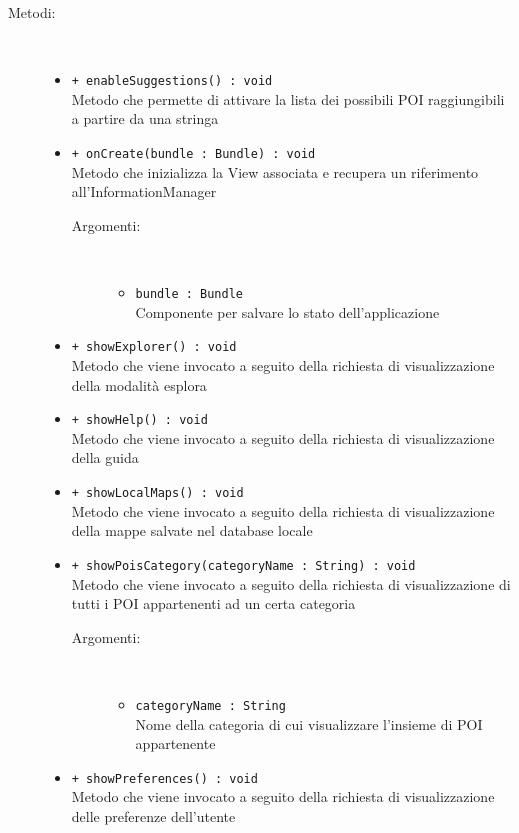 \documentclass[../DefinizioneDiProdotto.tex]{subfiles}
\begin{document}
\begin{description}
\begin{itemize}
\end{itemize}
\item[Metodi:] \
\begin{itemize}
\item \texttt{+ enableSuggestions() : void}\\
Metodo che permette di attivare la lista dei possibili POI raggiungibili a partire da una stringa
 \item \texttt{+ onCreate(bundle : Bundle) : void}\\
Metodo che inizializza la View associata e recupera un riferimento all'InformationManager
 \begin{description}
\item[Argomenti:] \
\begin{itemize}
\item \texttt{bundle : Bundle}\\
Componente per salvare lo stato dell'applicazione\end{itemize}
\end{description}
\item \texttt{+ showExplorer() : void}\\
Metodo che viene invocato a seguito della richiesta di visualizzazione della modalità esplora
 \item \texttt{+ showHelp() : void}\\
Metodo che viene invocato a seguito della richiesta di visualizzazione della guida
 \item \texttt{+ showLocalMaps() : void}\\
Metodo che viene invocato a seguito della richiesta di visualizzazione della mappe salvate nel database locale
 \item \texttt{+ showPoisCategory(categoryName : String) : void}\\
Metodo che viene invocato a seguito della richiesta di visualizzazione di tutti i POI appartenenti ad un certa categoria
 \begin{description}
\item[Argomenti:] \
\begin{itemize}
\item \texttt{categoryName : String}\\
Nome della categoria di cui visualizzare l'insieme di POI appartenente\end{itemize}
\end{description}
\item \texttt{+ showPreferences() : void}\\
Metodo che viene invocato a seguito della richiesta di visualizzazione delle preferenze dell'utente

\end{itemize}
\end{description}
\end{document}
